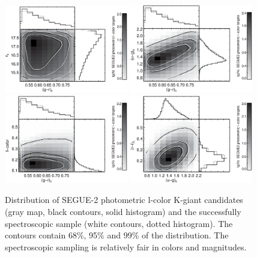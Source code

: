 \documentclass[12pt,preprint]{aastex}
\begin{document}
\begin{figure}[htbp]
\centering
\includegraphics[width=0.48\textwidth,height=0.3\textheight]{gmrvsr0_lctarget}
\includegraphics[width=0.48\textwidth,height=0.3\textheight]{gmrvsumg_lctarget}
\includegraphics[width=0.48\textwidth,height=0.3\textheight]{gmrvslcolor_lctarget}
\includegraphics[width=0.48\textwidth,height=0.3\textheight]{umgvsrmi_lctarget}
\caption{Distribution of SEGUE-2 photometric l-color K-giant candidates (gray map, black contours, solid histogram) and the successfully spectroscopic sample (white contours, dotted histogram). The contours contain 68\%, 95\% and 99\% of the distribution. The spectroscopic sampling is relatively fair in colors and magnitudes.}
\label{f:flkgbias}
\end{figure}
\end{document}
